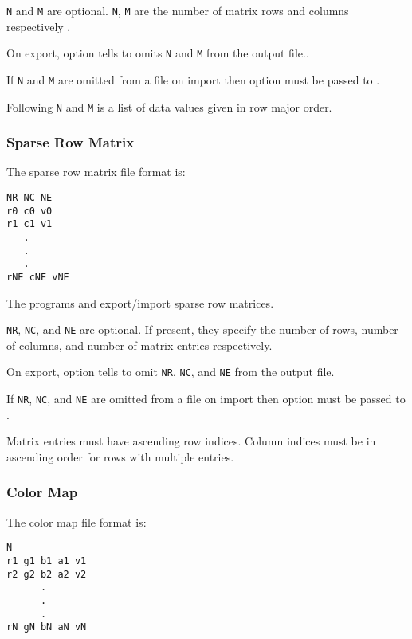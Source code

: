 \verb|N| and \verb|M| are optional.  \verb|N|, \verb|M| are the number
of matrix rows and columns respectively .  

On export, option  tells
 to omits \verb|N| and \verb|M| from the
output file..

If \verb|N| and \verb|M| are omitted from a file on import then option
 must be passed to
.

Following \verb|N| and \verb|M| is a list of data values given in row
major order.


\subsubsection{Sparse Row Matrix}

The sparse row matrix file format is:

\begin{verbatim}
NR NC NE
r0 c0 v0
r1 c1 v1
   .
   .
   .
rNE cNE vNE
\end{verbatim}

The programs  and
 export/import sparse row matrices.

\verb|NR|, \verb|NC|, and \verb|NE| are optional.  If present, they
specify the number of rows, number of columns, and number of matrix
entries respectively.

On export, option  tells
 to omit \verb|NR|, \verb|NC|, and
\verb|NE| from the output file.

If \verb|NR|, \verb|NC|, and \verb|NE| are omitted from a file on
import then option  must be passed to .

Matrix entries must have ascending row indices. Column indices must be
in ascending order for rows with multiple entries.

\subsubsection{Color Map}
\label{sec:colormap_fmt}

The color map file format is:

\begin{verbatim}
N
r1 g1 b1 a1 v1
r2 g2 b2 a2 v2
      .
      .
      .
rN gN bN aN vN
\end{verbatim}

